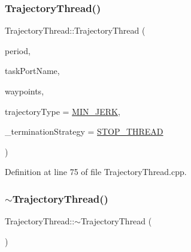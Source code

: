 \subsubsection{\texorpdfstring{Trajectory\+Thread()}{TrajectoryThread()}\hspace{0.1cm}{\footnotesize\ttfamily [3/3]}}
{\footnotesize\ttfamily Trajectory\+Thread\+::\+Trajectory\+Thread (\begin{DoxyParamCaption}\item[{int}]{period,  }\item[{const std\+::string \&}]{task\+Port\+Name,  }\item[{const std\+::list$<$ Eigen\+::\+Vector\+Xd $>$ \&}]{waypoints,  }\item[{const \hyperlink{namespaceocra__recipes_a729e1c8304e390d16219eda5f9756152}{T\+R\+A\+J\+E\+C\+T\+O\+R\+Y\+\_\+\+T\+Y\+PE}}]{trajectory\+Type = {\ttfamily \hyperlink{namespaceocra__recipes_a729e1c8304e390d16219eda5f9756152ad90eb95c7a6e37072c38d0f83980bff7}{M\+I\+N\+\_\+\+J\+E\+RK}},  }\item[{const \hyperlink{namespaceocra__recipes_afcf7ca623a6c39b246aa4bda629c7309}{T\+E\+R\+M\+I\+N\+A\+T\+I\+O\+N\+\_\+\+S\+T\+R\+A\+T\+E\+GY}}]{\+\_\+termination\+Strategy = {\ttfamily \hyperlink{namespaceocra__recipes_afcf7ca623a6c39b246aa4bda629c7309a0dc02a3e20f98a401113c91d7e6d4528}{S\+T\+O\+P\+\_\+\+T\+H\+R\+E\+AD}} }\end{DoxyParamCaption})}



Definition at line 75 of file Trajectory\+Thread.\+cpp.

\hypertarget{classocra__recipes_1_1TrajectoryThread_a7a54232683c5a3e3ef43f9b270b21c50}{}\label{classocra__recipes_1_1TrajectoryThread_a7a54232683c5a3e3ef43f9b270b21c50} 
\subsubsection{\texorpdfstring{$\sim$\+Trajectory\+Thread()}{~TrajectoryThread()}}
{\footnotesize\ttfamily Trajectory\+Thread\+::$\sim$\+Trajectory\+Thread (\begin{DoxyParamCaption}{ }\end{DoxyParamCaption})}



